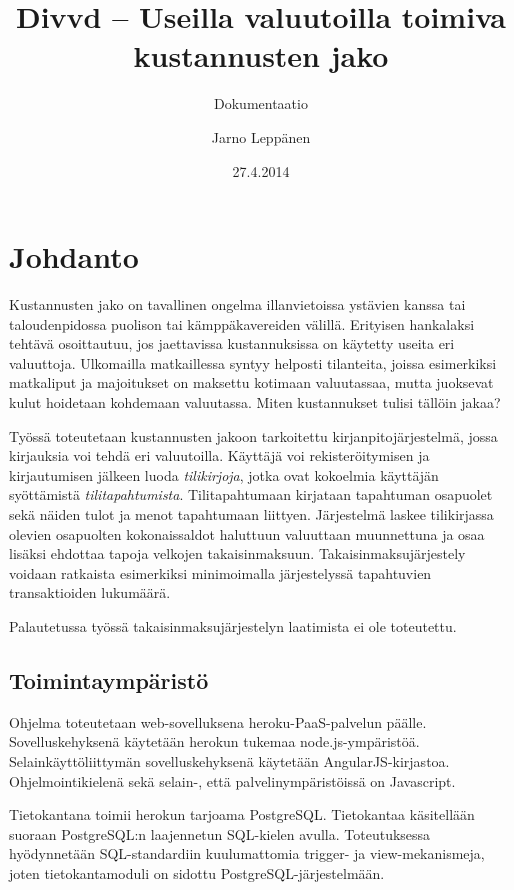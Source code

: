 \documentclass[a4paper,parskip=half]{scrartcl}
\author{Jarno Leppänen}
\title{Divvd -- Useilla valuutoilla toimiva kustannusten jako}
\subtitle{Dokumentaatio}
\date{27.4.2014}
\begin{document}
\maketitle

\tableofcontents

\section{Johdanto}

Kustannusten jako on tavallinen ongelma illanvietoissa ystävien
kanssa tai taloudenpidossa puolison tai kämppäkavereiden välillä. Erityisen
hankalaksi tehtävä osoittautuu, jos jaettavissa kustannuksissa on käytetty
useita eri valuuttoja. Ulkomailla matkaillessa syntyy helposti tilanteita,
joissa esimerkiksi matkaliput ja majoitukset on maksettu kotimaan valuutassaa,
mutta juoksevat kulut hoidetaan kohdemaan valuutassa. Miten kustannukset
tulisi tällöin jakaa?

Työssä toteutetaan kustannusten jakoon tarkoitettu kirjanpitojärjestelmä, jossa
kirjauksia voi tehdä eri valuutoilla. Käyttäjä voi rekisteröitymisen ja
kirjautumisen jälkeen luoda \textit{tilikirjoja}, jotka ovat kokoelmia
käyttäjän syöttämistä \textit{tilitapahtumista}. Tilitapahtumaan kirjataan
tapahtuman osapuolet sekä näiden tulot ja menot tapahtumaan liittyen.
Järjestelmä laskee tilikirjassa olevien osapuolten kokonaissaldot haluttuun
valuuttaan muunnettuna ja osaa lisäksi ehdottaa tapoja velkojen
takaisinmaksuun. Takaisinmaksujärjestely voidaan ratkaista esimerkiksi
minimoimalla järjestelyssä tapahtuvien transaktioiden
lukumäärä\cite{verhoeff2004settling}.

Palautetussa työssä takaisinmaksujärjestelyn laatimista ei ole toteutettu.

\subsection{Toimintaympäristö}

Ohjelma toteutetaan web-sovelluksena heroku-PaaS-palvelun päälle.
Sovelluskehyksenä käytetään herokun tukemaa node.js-ympäristöä.
Selainkäyttöliittymän sovelluskehyksenä käytetään AngularJS-kirjastoa.
Ohjelmointikielenä sekä selain-, että palvelinympäristöissä on Javascript.

Tietokantana toimii herokun tarjoama PostgreSQL. Tietokantaa käsitellään
suoraan Postgre\-SQL:n laajennetun SQL-kielen avulla. Toteutuksessa
hyödynnetään SQL-standardiin kuulumattomia trigger- ja view-mekanismeja, joten
tietokantamoduli on sidottu Post\-gre\-SQL-jär\-jes\-tel\-mään.
\end{document}
